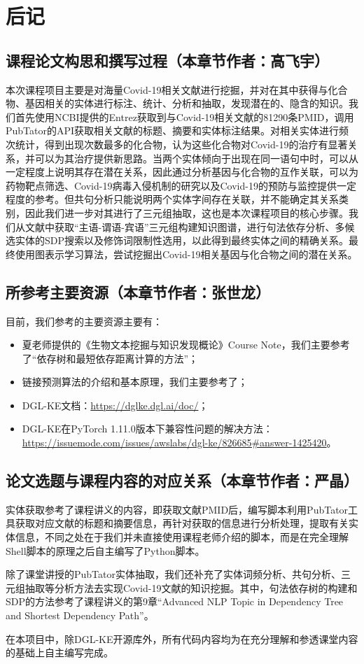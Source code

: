 \documentclass[twocolumn]{article}
\begin{document}
\section{后记}

\subsection{课程论文构思和撰写过程（本章节作者：高飞宇）}
本次课程项目主要是对海量Covid-19相关文献进行挖掘，并对在其中获得与化合物、基因相关的实体进行标注、统计、分析和抽取，发现潜在的、隐含的知识。我们首先使用NCBI提供的Entrez获取到与Covid-19相关文献的81290条PMID，调用PubTator的API获取相关文献的标题、摘要和实体标注结果。对相关实体进行频次统计，得到出现次数最多的化合物，认为这些化合物对Covid-19的治疗有显著关系，并可以为其治疗提供新思路。当两个实体倾向于出现在同一语句中时，可以从一定程度上说明其存在潜在关系，因此通过分析基因与化合物的互作关联，可以为药物靶点筛选、Covid-19病毒入侵机制的研究以及Covid-19的预防与监控提供一定程度的参考。但共句分析只能说明两个实体字间存在关联，并不能确定其关系类别，因此我们进一步对其进行了三元组抽取，这也是本次课程项目的核心步骤。我们从文献中获取“主语-谓语-宾语”三元组构建知识图谱，进行句法依存分析、多候选实体的SDP搜索以及修饰词限制性选用，以此得到最终实体之间的精确关系。最终使用图表示学习算法，尝试挖掘出Covid-19相关基因与化合物之间的潜在关系。\par

\subsection{所参考主要资源（本章节作者：张世龙）}
目前，我们参考的主要资源主要有：
\begin{itemize}
	\item 夏老师提供的《生物文本挖掘与知识发现概论》Course Note，我们主要参考了“依存树和最短依存距离计算的方法”；
	\item 链接预测算法的介绍和基本原理，我们主要参考了\cite{link_prediction}；
	\item DGL-KE文档：\url{https://dglke.dgl.ai/doc/}；
	\item DGL-KE在PyTorch 1.11.0版本下兼容性问题的解决方法：\url{https://issuemode.com/issues/awslabs/dgl-ke/826685#answer-1425420}。
\end{itemize}

\subsection{论文选题与课程内容的对应关系（本章节作者：严晶）}
实体获取参考了课程讲义的内容，即获取文献PMID后，编写脚本利用PubTator工具获取对应文献的标题和摘要信息，再针对获取的信息进行分析处理，提取有关实体信息，不同之处在于我们并未直接使用课程老师介绍的脚本，而是在完全理解Shell脚本的原理之后自主编写了Python脚本。\par
除了课堂讲授的PubTator实体抽取，我们还补充了实体词频分析、共句分析、三元组抽取等分析方法去实现Covid-19文献的知识挖掘。其中，句法依存树的构建和SDP的方法参考了课程讲义的第9章“Advanced NLP Topic in Dependency Tree and Shortest Dependency Path”。\par
在本项目中，除DGL-KE开源库外，所有代码内容均为在充分理解和参透课堂内容的基础上自主编写完成。\par
\end{document}
